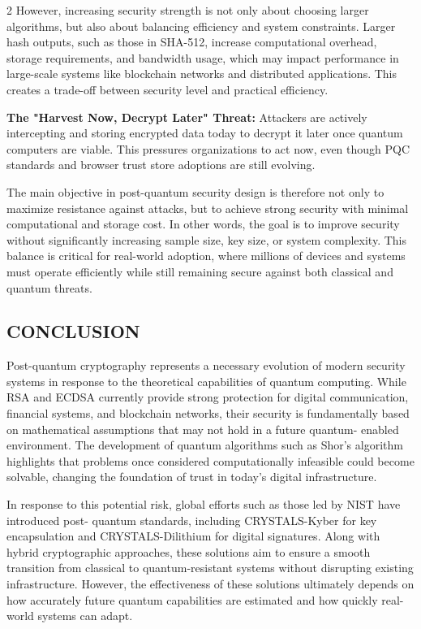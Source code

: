 \begin{multicols}{2}
  \noindent
  However, increasing security strength is not only about choosing larger algorithms, but also about
  balancing efficiency and system constraints. Larger hash outputs, such as those in SHA-512, increase
  computational overhead, storage requirements, and bandwidth usage, which may impact performance
  in large-scale systems like blockchain networks and distributed applications. This creates a trade-off
  between security level and practical efficiency.

  \noindent
  \textbf{The "Harvest Now, Decrypt Later" Threat:} Attackers are actively intercepting and storing
  encrypted data today to decrypt it later once quantum computers are viable. This pressures
  organizations to act now, even though PQC standards and browser trust store adoptions are still
  evolving.

  \noindent
  The main objective in post-quantum security design is therefore not only to maximize resistance
  against attacks, but to achieve strong security with minimal computational and storage cost. In other
  words, the goal is to improve security without significantly increasing sample size, key size, or system
  complexity. This balance is critical for real-world adoption, where millions of devices and systems
  must operate efficiently while still remaining secure against both classical and quantum threats.

  \subsection*{\centering\uppercase{Conclusion}}
  Post-quantum cryptography represents a necessary evolution of modern security systems in response
  to the theoretical capabilities of quantum computing. While RSA and ECDSA currently provide
  strong protection for digital communication, financial systems, and blockchain networks, their
  security is fundamentally based on mathematical assumptions that may not hold in a future quantum-
  enabled environment. The development of quantum algorithms such as Shor’s algorithm highlights
  that problems once considered computationally infeasible could become solvable, changing the
  foundation of trust in today’s digital infrastructure.

  \noindent
  In response to this potential risk, global efforts such as those led by NIST have introduced post-
  quantum standards, including CRYSTALS-Kyber for key encapsulation and CRYSTALS-Dilithium
  for digital signatures. Along with hybrid cryptographic approaches, these solutions aim to ensure a
  smooth transition from classical to quantum-resistant systems without disrupting existing
  infrastructure. However, the effectiveness of these solutions ultimately depends on how accurately
  future quantum capabilities are estimated and how quickly real-world systems can adapt.


\end{multicols}
